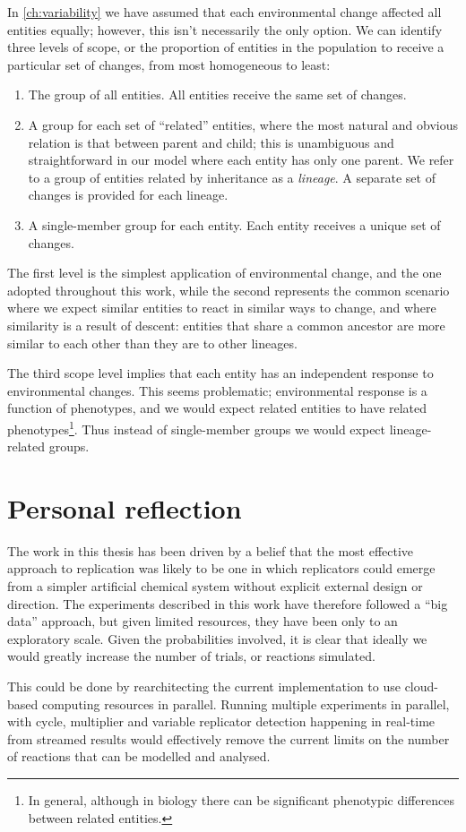 In \cref{ch:variability} we have assumed that each environmental change affected all entities equally; however, this isn't necessarily the only option. We can identify three levels of scope, or the proportion of entities in the population to receive a particular set of changes, from most homogeneous to least:

\begin{enumerate}
	\item The group of all entities. All entities receive the same set of changes.
	\item A group for each set of ``related'' entities, where the most natural and obvious relation is that between parent and child; this is unambiguous and straightforward in our model where each entity has only one parent. We refer to a group of entities related by inheritance as a \emph{lineage}. A separate set of changes is provided for each lineage.
	\item A single-member group for each entity. Each entity receives a unique set of changes.
\end{enumerate}

The first level is the simplest application of environmental change, and the one adopted throughout this work, while the second represents the common scenario where we expect similar entities to react in similar ways to change, and where similarity is a result of descent: entities that share a common ancestor are more similar to each other than they are to other lineages. 

The third scope level implies that each entity has an independent response to environmental changes. This seems problematic; environmental response is a function of phenotypes, and we would expect related entities to have related phenotypes\footnote{In general, although in biology there can be significant phenotypic differences between related entities.}. Thus instead of single-member groups we would expect lineage-related groups.

\section{Personal reflection}

The work in this thesis has been driven by a belief that the most effective approach to replication was likely to be one in which replicators could emerge from a simpler artificial chemical system without explicit external design or direction. The experiments described in this work have therefore followed a ``big data'' approach, but given limited resources, they have been only to an exploratory scale. Given the probabilities involved, it is clear that ideally we would greatly increase the number of trials, or reactions simulated.

This could be done by rearchitecting the current implementation to use cloud-based computing resources in parallel. Running multiple experiments in parallel, with cycle, multiplier and variable replicator detection happening in real-time from streamed results would effectively remove the current limits on the number of reactions that can be modelled and analysed.



